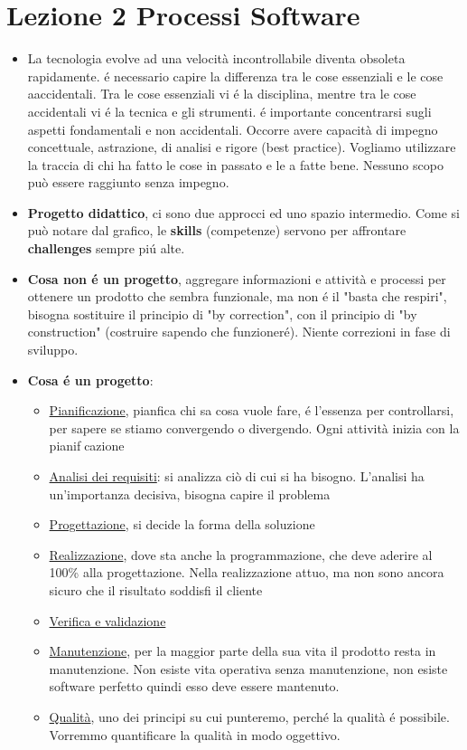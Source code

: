 \documentclass[a4paper,10pt] {article}
\begin{document}
\section{Lezione 2 Processi Software}
\begin{itemize}
\item La tecnologia evolve ad una velocità incontrollabile diventa obsoleta
rapidamente. é necessario capire la differenza tra le cose essenziali e le cose
aaccidentali. Tra le cose essenziali vi é la disciplina, mentre tra le cose
accidentali vi  é la tecnica e gli strumenti. é importante concentrarsi sugli
aspetti fondamentali e non accidentali. Occorre avere capacità di impegno
concettuale, astrazione, di analisi e rigore (best practice). Vogliamo utilizzare
la traccia di chi ha fatto le cose in passato e le a fatte bene. Nessuno scopo
può essere raggiunto senza impegno.


\item \textbf{Progetto didattico}, ci sono due approcci ed uno spazio intermedio.
Come si può notare dal grafico, le \textbf{skills} (competenze) servono per
affrontare \textbf{challenges} sempre pi\'u alte.

\item \textbf{Cosa non é un progetto}, aggregare informazioni e attività e
processi per ottenere un prodotto che sembra funzionale, ma non é il "basta
che respiri", bisogna sostituire il principio di "by correction", con il principio
di "by construction" (costruire sapendo che funzioneré). Niente correzioni
in fase di sviluppo.

\item \textbf{Cosa é un progetto}:
	\begin{itemize}
	\item \underline{Pianificazione}, pianfica chi sa cosa vuole fare, é 
	l'essenza
	per controllarsi, per sapere se stiamo
		convergendo o divergendo. Ogni attività inizia con la pianifcazione
	\item \underline{Analisi dei requisiti}: si analizza ciò di cui si ha 
	bisogno.
	L'analisi ha un'importanza decisiva, bisogna
				capire il problema
				\item \underline{Progettazione}, si decide la forma della 
				soluzione
	\item \underline{Realizzazione}, dove sta anche la programmazione, che deve
	aderire al 100\% alla progettazione. Nella
	realizzazione attuo, ma non sono ancora sicuro che il risultato soddisfi il
	cliente
				\item \underline{Verifica e validazione}
	\item \underline{Manutenzione}, per la maggior parte della sua vita il 
	prodotto
	resta in manutenzione. Non esiste vita
	operativa senza manutenzione, non esiste software perfetto quindi esso deve 
	essere
	mantenuto.
	\item \underline{Qualità}, uno dei principi su cui punteremo, perché la 
	qualità é
	possibile. Vorremmo quantificare la	qualità in modo oggettivo.
	\end{itemize}
	

\end{itemize}
\end{document}
